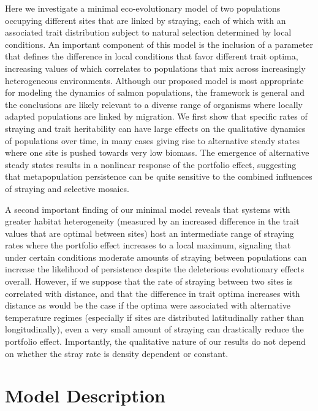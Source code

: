 \documentclass[twocolumn,preprintnumbers,amsmath,amssymb,superscriptaddress]{revtex4}
\begin{document}
Here we investigate a minimal eco-evolutionary model of two populations occupying different sites that are linked by straying, each of which with an associated trait distribution subject to natural selection determined by local conditions.
An important component of this model is the inclusion of a parameter that defines the difference in local conditions that favor different trait optima, increasing values of which correlates to populations that mix across increasingly heterogeneous environments.
Although our proposed model is most appropriate for modeling the dynamics of salmon populations, the framework is general and the conclusions are likely relevant to a diverse range of organisms where locally adapted populations are linked by migration.
We first show that specific rates of straying and trait heritability can have large effects on the qualitative dynamics of populations over time, in many cases giving rise to alternative steady states where one site is pushed towards very low biomass.
The emergence of alternative steady states results in a nonlinear response of the portfolio effect, suggesting that metapopulation persistence can be quite sensitive to the combined influences of straying and selective mosaics.

A second important finding of our minimal model reveals that systems with greater habitat heterogeneity (measured by an increased difference in the trait values that are optimal between sites) host an intermediate range of straying rates where the portfolio effect increases to a local maximum, signaling that under certain conditions moderate amounts of straying between populations can increase the likelihood of persistence despite the deleterious evolutionary effects overall.
However, if we suppose that the rate of straying between two sites is correlated with distance, and that the difference in trait optima increases with distance as would be the case if the optima were associated with alternative temperature regimes (especially if sites are distributed latitudinally rather than longitudinally), even a very small amount of straying can drastically reduce the portfolio effect.
Importantly, the qualitative nature of our results do not depend on whether the stray rate is density dependent or constant.





\section*{Model Description}
\end{document}
